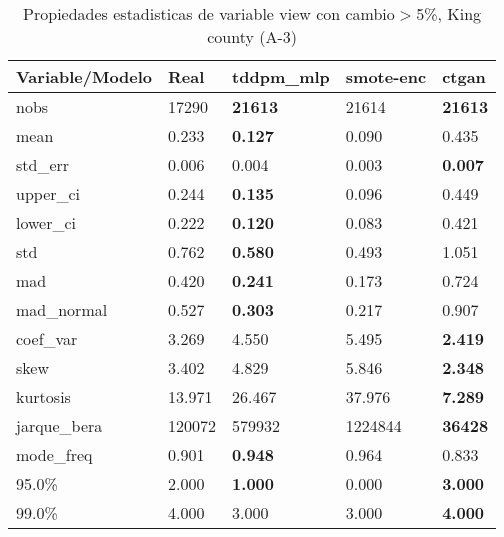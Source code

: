 \begin{table}[H]
\centering
\fontsize{8}{14}\selectfont
\caption{Propiedades estadisticas de variable view con cambio\ensuremath{>}5\%, King county (A-3)}
\label{table-stats-king county-a-3-view-short}
\begin{tabular}{|l|m{10em}|m{10em}|m{10em}|m{10em}|}
\hline
 \rowcolor[gray]{0.8}
Variable/Modelo & Real & tddpm\_mlp & smote-enc & ctgan \\
\hline nobs & 17290 & \bfseries 21613 & \cellcolor[rgb]{0.9, 0.54, 0.52} 21614 & \bfseries 21613 \\
\hline mean & 0.233 & \bfseries 0.127 & 0.090 & \cellcolor[rgb]{0.9, 0.54, 0.52} 0.435 \\
\hline std\_err & 0.006 & 0.004 & \cellcolor[rgb]{0.9, 0.54, 0.52} 0.003 & \bfseries 0.007 \\
\hline upper\_ci & 0.244 & \bfseries 0.135 & 0.096 & \cellcolor[rgb]{0.9, 0.54, 0.52} 0.449 \\
\hline lower\_ci & 0.222 & \bfseries 0.120 & 0.083 & \cellcolor[rgb]{0.9, 0.54, 0.52} 0.421 \\
\hline std & 0.762 & \bfseries 0.580 & 0.493 & \cellcolor[rgb]{0.9, 0.54, 0.52} 1.051 \\
\hline mad & 0.420 & \bfseries 0.241 & 0.173 & \cellcolor[rgb]{0.9, 0.54, 0.52} 0.724 \\
\hline mad\_normal & 0.527 & \bfseries 0.303 & 0.217 & \cellcolor[rgb]{0.9, 0.54, 0.52} 0.907 \\
\hline coef\_var & 3.269 & 4.550 & \cellcolor[rgb]{0.9, 0.54, 0.52} 5.495 & \bfseries 2.419 \\
\hline skew & 3.402 & 4.829 & \cellcolor[rgb]{0.9, 0.54, 0.52} 5.846 & \bfseries 2.348 \\
\hline kurtosis & 13.971 & 26.467 & \cellcolor[rgb]{0.9, 0.54, 0.52} 37.976 & \bfseries 7.289 \\
\hline jarque\_bera & 120072 & 579932 & \cellcolor[rgb]{0.9, 0.54, 0.52} 1224844 & \bfseries 36428 \\
\hline mode\_freq & 0.901 & \bfseries 0.948 & 0.964 & \cellcolor[rgb]{0.9, 0.54, 0.52} 0.833 \\
\hline 95.0\% & 2.000 & \bfseries 1.000 & \cellcolor[rgb]{0.9, 0.54, 0.52} 0.000 & \bfseries 3.000 \\
\hline 99.0\% & 4.000 & \cellcolor[rgb]{0.9, 0.54, 0.52} 3.000 & \cellcolor[rgb]{0.9, 0.54, 0.52} 3.000 & \bfseries 4.000 \\
\hline
\end{tabular}
\end{table}

